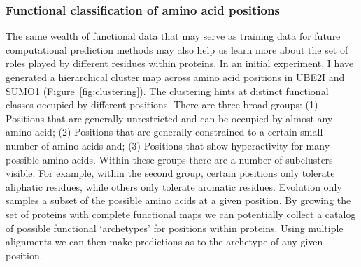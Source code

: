 \subsubsection{Functional classification of amino acid positions}
The same wealth of functional data that may serve as training data for future computational prediction methods may also help us learn more about the set of roles played by different residues within proteins. In an initial experiment, I have generated a hierarchical cluster map across amino acid positions in UBE2I and SUMO1 (Figure~\ref{fig:clustering}). The clustering hints at distinct functional classes occupied by different positions. There are three broad groups: (1) Positions that are generally unrestricted and can be occupied by almost any amino acid; (2) Positions that are generally constrained to a certain small number of amino acids and; (3) Positions that show hyperactivity for many possible amino acids. Within these groups there are a number of subclusters visible. For example, within the second group, certain positions only tolerate aliphatic residues, while others only tolerate aromatic residues. Evolution only samples a subset of the possible amino acids at a given position. By growing the set of proteins with complete functional maps we can potentially collect a catalog of possible functional `archetypes' for positions within proteins. Using multiple alignments we can then make predictions as to the archetype of any given position.
